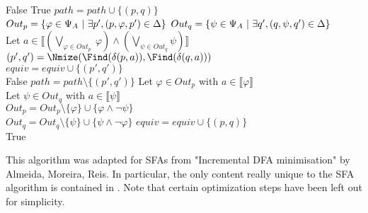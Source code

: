 \documentclass[12pt]{article}
\newcommand{\suchthat}{\hphantom l | \hphantom l}
\newcommand{\denotation}[1]{\llbracket #1 \rrbracket}
\begin{document}
\begin{algorithm}
{
	{
		\Return False
	}
	{
		\Return True
	}
	$path = path \cup \{ (p,q) \}$\\
	$Out_p = \{ \varphi \in \Psi_A \suchthat \exists p', (p,\varphi,p')\in\Delta\}$ 
	$Out_q = \{ \psi \in \Psi_A \suchthat \exists q', (q,\psi,q')\in \Delta \}$\\
	{
		Let $a \in \denotation{(\bigvee_{\varphi \in Out_p} \ \varphi) \wedge (\bigvee_{\psi \in Out_q} \psi)}$ 
		$(p',q') = \Nmize(\Find(\delta(p,a)), \Find(\delta(q,a)))$\\
		{
			$equiv = equiv \cup \{(p',q')\}$\\
			{
				\Return False
			}
			\Else
			{
				$path = path \setminus \{(p',q')\}$
			}
		}
		Let $\varphi \in Out_p$ with $a \in \denotation{\varphi}$\\
		Let $\psi \in Out_q$ with $a \in \denotation{\psi}$\\
		$Out_p = Out_p \setminus \{ \varphi \} \cup \{\varphi \wedge \neg \psi\}$\\
		$Out_q = Out_q \setminus \{ \psi\} \cup \{\psi \wedge \neg \varphi \}$
	}
	$equiv = equiv \cup \{(p,q)\}$\\
	\Return True
}
\end{algorithm}

This algorithm was adapted for SFAs from "Incremental DFA minimisation" by Almeida, Moreira, Reis. In particular, the only content really unique to the SFA algorithm is contained in \Equivp. Note that certain optimization steps have been left out for simplicity.
\end{document}
